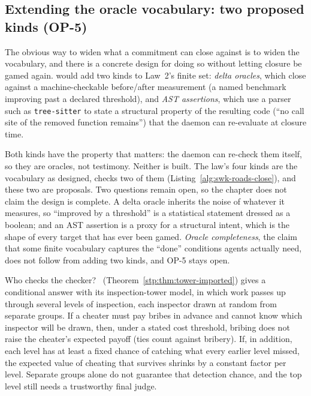 \documentclass[11pt,a4paper]{article}
\theoremstyle{definition}
\theoremstyle{remark}
\begin{document}
\subsection{Extending the oracle vocabulary: two proposed kinds (OP-5)}

The obvious way to widen what a commitment can close against is to widen the
vocabulary, and there is a concrete design for doing so without letting closure
be gamed again.  would add two kinds to
Law~2's finite set: \emph{delta oracles}, which close against a
machine-checkable before/after measurement (a named benchmark improving past a
declared threshold), and \emph{AST assertions}, which use a parser such as
\texttt{tree-sitter} to state a structural property of the resulting code (``no call
site of the removed function remains'') that the daemon can re-evaluate at closure time.

Both kinds have the property that matters: the daemon can re-check them itself,
so they are oracles, not testimony. Neither is built. The law's four kinds
are the vocabulary as designed, \pdkernelname{} checks two of them
(Listing~\ref{alg:swk-roads-close}), and these two are proposals. Two
questions remain open, so the chapter does not claim the design is complete. A delta oracle inherits the noise of whatever it measures, so ``improved by a
threshold'' is a statistical statement dressed as a boolean; and an AST assertion is
a proxy for a structural intent, which is the shape of every target that has ever
been gamed. \emph{Oracle completeness}, the claim that some finite vocabulary
captures the ``done'' conditions agents actually need, does not follow from
adding two kinds, and OP-5 stays open.

Who checks the checker? %
\ifpdbook\ (Theorem~\ref{stp:thm:tower-imported})\fi{} gives a conditional
answer with its inspection-tower model, in which work passes up through
several levels of inspection, each inspector drawn at random from separate groups. If a cheater
must pay bribes in advance and cannot know which inspector will be drawn, then,
under a stated cost threshold, bribing does not raise the cheater's expected
payoff (ties count against bribery). If, in addition, each level has at least a
fixed chance of catching what every earlier level missed, the expected value of
cheating that survives shrinks by a constant factor per level. Separate groups
alone do not guarantee that detection chance, and the top level still needs a
trustworthy final judge.
\end{document}
